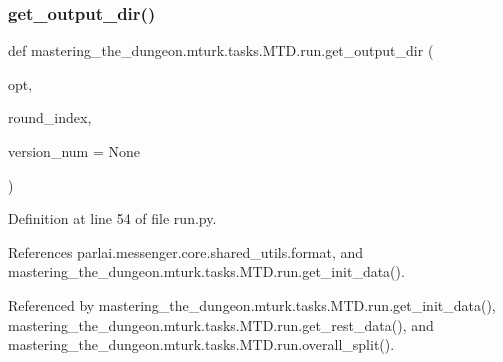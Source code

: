 \subsubsection{\texorpdfstring{get\+\_\+output\+\_\+dir()}{get\_output\_dir()}}
{\footnotesize\ttfamily def mastering\+\_\+the\+\_\+dungeon.\+mturk.\+tasks.\+M\+T\+D.\+run.\+get\+\_\+output\+\_\+dir (\begin{DoxyParamCaption}\item[{}]{opt,  }\item[{}]{round\+\_\+index,  }\item[{}]{version\+\_\+num = {\ttfamily None} }\end{DoxyParamCaption})}



Definition at line 54 of file run.\+py.



References parlai.\+messenger.\+core.\+shared\+\_\+utils.\+format, and mastering\+\_\+the\+\_\+dungeon.\+mturk.\+tasks.\+M\+T\+D.\+run.\+get\+\_\+init\+\_\+data().



Referenced by mastering\+\_\+the\+\_\+dungeon.\+mturk.\+tasks.\+M\+T\+D.\+run.\+get\+\_\+init\+\_\+data(), mastering\+\_\+the\+\_\+dungeon.\+mturk.\+tasks.\+M\+T\+D.\+run.\+get\+\_\+rest\+\_\+data(), and mastering\+\_\+the\+\_\+dungeon.\+mturk.\+tasks.\+M\+T\+D.\+run.\+overall\+\_\+split().

